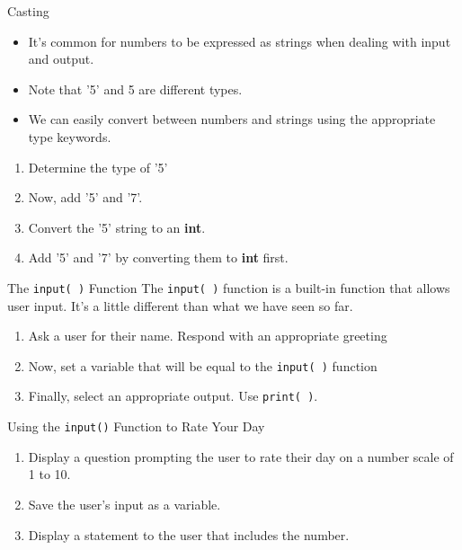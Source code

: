 \documentclass[../main.tex]{subfiles}
\begin{document}
\begin{frame}{Casting}
  \begin{itemize} \justifying \parskip3mm
  \item   It's common for numbers to be expressed as strings when dealing with input and output. 
  \item Note that '5' and 5 are different types. 
  \item We can easily convert between numbers and strings using the appropriate type keywords. 
  \end{itemize}

  \begin{exercise}{}
    \begin{enumerate} \justifying
    \item Determine the type of '5'
    \item Now, add '5' and '7'.
    \item Convert the '5' string to an \textbf{int}.
    \item Add '5' and '7' by converting them to \textbf{int} first.
    \end{enumerate}
  \end{exercise}
\end{frame}

\begin{frame}[fragile]{The \texttt{input( )} Function}
  The \texttt{input( )} function is a built-in function that allows user input. It's a little different than what we have seen so far.

  \begin{exercise}{}
    \begin{enumerate} \justifying
    \item Ask a user for their name. Respond with an appropriate greeting
    \item Now, set a variable that will be equal to the \texttt{input( )} function
    \item Finally, select an appropriate output. Use \texttt{print( )}.
    \end{enumerate}
  \end{exercise}
\end{frame}

\begin{frameact}{Using the \texttt{input()} Function to Rate Your Day}
  \begin{enumerate} \justifying
  \item Display a question prompting the user to rate their day on a number scale of 1 to 10.
  \item Save the user's input as a variable.
  \item Display a statement to the user that includes the number.
  \end{enumerate}
\end{frameact}
\end{document}

